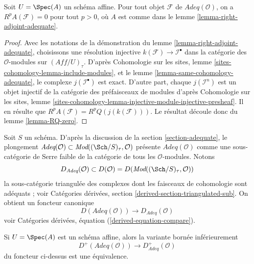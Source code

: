 \begin{lemma}
\label{lemma-RA-zero}
Soit $U = \Spec(A)$ un schéma affine.
Pour tout objet $\mathcal{F}$ de $\textit{Adeq}(\mathcal{O})$,
on a $R^pA(\mathcal{F}) = 0$ pour tout $p > 0$, où $A$ est
comme dans le
lemme \ref{lemma-right-adjoint-adequate}.
\end{lemma}

\begin{proof}
Avec les notations de la démonstration du
lemme \ref{lemma-right-adjoint-adequate},
choisissons une résolution injective $k(\mathcal{F}) \to \mathcal{I}^\bullet$
dans la catégorie des $\mathcal{O}$-modules sur $(\textit{Aff}/U)_\tau$.
D'après
Cohomologie sur les sites, lemme \ref{sites-cohomology-lemma-include-modules},
et le
lemme \ref{lemma-same-cohomology-adequate},
le complexe $j(\mathcal{I}^\bullet)$ est exact.
D'autre part, chaque $j(\mathcal{I}^n)$ est un objet injectif
de la catégorie des préfaisceaux de modules d'après
Cohomologie sur les sites, lemme
\ref{sites-cohomology-lemma-injective-module-injective-presheaf}.
Il en résulte que $R^pA(\mathcal{F}) = R^pQ(j(k(\mathcal{F})))$.
Le résultat découle donc du
lemme \ref{lemma-RQ-zero}.
\end{proof}

\noindent
Soit $S$ un schéma. D'après la discussion de la
section \ref{section-adequate},
le plongement
$\textit{Adeq}(\mathcal{O}) \subset
\textit{Mod}((\Sch/S)_\tau, \mathcal{O})$
présente $\textit{Adeq}(\mathcal{O})$ comme une sous-catégorie de Serre faible de
la catégorie de tous les $\mathcal{O}$-modules. Notons
$$
D_{\textit{Adeq}}(\mathcal{O}) \subset
D(\mathcal{O}) = D(\textit{Mod}((\Sch/S)_\tau, \mathcal{O}))
$$
la sous-catégorie triangulée des complexes dont les faisceaux de cohomologie
sont adéquats ; voir
Catégories dérivées, section \ref{derived-section-triangulated-sub}.
On obtient un foncteur canonique
$$
D(\textit{Adeq}(\mathcal{O}))
\longrightarrow
D_{\textit{Adeq}}(\mathcal{O})
$$
voir
Catégories dérivées, équation (\ref{derived-equation-compare}).

\begin{lemma}
\label{lemma-bounded-below}
Si $U = \Spec(A)$ est un schéma affine, alors la variante
bornée inférieurement
\begin{equation}
\label{equation-compare-bounded-adequate}
D^+(\textit{Adeq}(\mathcal{O}))
\longrightarrow
D^+_{\textit{Adeq}}(\mathcal{O})
\end{equation}
du foncteur ci-dessus est une équivalence.
\end{lemma}

